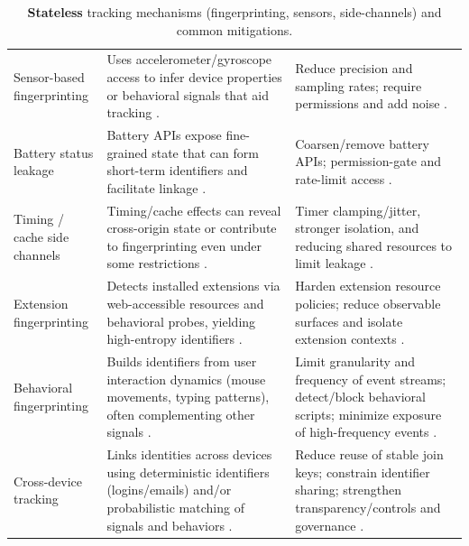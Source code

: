 \begin{table}[t]
\begin{tabularx}{\textwidth}{p{2.8cm} Y Y}
Sensor-based fingerprinting &
Uses accelerometer/gyroscope access to infer device properties or behavioral signals that aid tracking \cite{dasTrackingMobileWeb2016,dasWebsSixthSense2018}. &
Reduce precision and sampling rates; require permissions and add noise \cite{dasWebsSixthSense2018}. \\

Battery status leakage &
Battery APIs expose fine-grained state that can form short-term identifiers and facilitate linkage \cite{olejnikLeakingBatteryPrivacy2016,olejnikBatteryStatusNot2017}. &
Coarsen/remove battery APIs; permission-gate and rate-limit access \cite{olejnikBatteryStatusNot2017}. \\

Timing / cache side channels &
Timing/cache effects can reveal cross-origin state or contribute to fingerprinting even under some restrictions \cite{sanchez-rolaClockClockTimeBased2018,weinbergStillKnowWhat2011,shusterman2021prime+,jinTimingBasedBrowsingPrivacy2022}. &
Timer clamping/jitter, stronger isolation, and reducing shared resources to limit leakage \cite{sanchez-rolaClockClockTimeBased2018,rescorlaTechnicalCommentsPrivacy2021}. \\

Extension fingerprinting &
Detects installed extensions via web-accessible resources and behavioral probes, yielding high-entropy identifiers \cite{starovXHOUNDQuantifyingFingerprintability2017,trickelEveryoneDifferentClientside2019,karamiCarnusExploringPrivacy2020,karamiUnleashSimulacrumShifting2022,agarwalPeekingWindowFingerprinting2024}. &
Harden extension resource policies; reduce observable surfaces and isolate extension contexts \cite{laperdrixFingerprintingStyleDetecting2021}. \\

Behavioral fingerprinting &
Builds identifiers from user interaction dynamics (mouse movements, typing patterns), often complementing other signals \cite{leivaMyMouseMy2021,yuanCrossdeviceTrackingIdentification2018}. &
Limit granularity and frequency of event streams; detect/block behavioral scripts; minimize exposure of high-frequency events \cite{leivaMyMouseMy2021}. \\

Cross-device tracking &
Links identities across devices using deterministic identifiers (logins/emails) and/or probabilistic matching of signals and behaviors \cite{diaz-moralesCrossDeviceTrackingMatching2015,brookmanCrossDeviceTrackingMeasurement2017,zimmeckPrivacyAnalysisCrossdevice2017,wangGraphTrackGraphbasedCrossDevice2022}. &
Reduce reuse of stable join keys; constrain identifier sharing; strengthen transparency/controls and governance \cite{brookmanCrossDeviceTrackingMeasurement2017,zimmeckPrivacyAnalysisCrossdevice2017}. \\

\bottomrule
\end{tabularx}
\caption{\textbf{Stateless} tracking mechanisms (fingerprinting, sensors, side-channels) and common mitigations.}
\label{tab:appendix-stateless-tracking}
\end{table}

